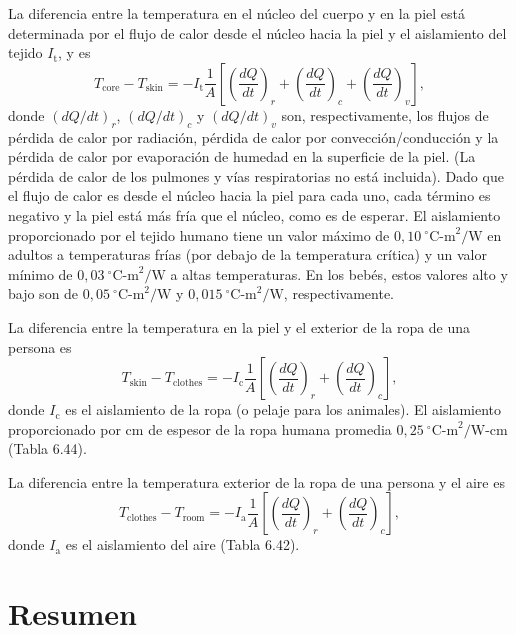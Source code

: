 \documentclass[12pt]{book}
\begin{document}
La diferencia entre la temperatura en el núcleo del cuerpo y en la piel está determinada por el flujo de calor desde el núcleo hacia la piel y el aislamiento del tejido $I_{\text{t}}$, y es
\begin{equation}
T_{\text{core}} - T_{\text{skin}} = -I_{\text{t}} \frac{1}{A} \left[ \left(\frac{dQ}{dt}\right)_r + \left(\frac{dQ}{dt}\right)_c + \left(\frac{dQ}{dt}\right)_v \right],
\label{eq:674}
\end{equation}
donde $(dQ/dt)_r$, $(dQ/dt)_c$ y $(dQ/dt)_v$ son, respectivamente, los flujos de pérdida de calor por radiación, pérdida de calor por convección/conducción y la pérdida de calor por evaporación de humedad en la superficie de la piel. (La pérdida de calor de los pulmones y vías respiratorias no está incluida). Dado que el flujo de calor es desde el núcleo hacia la piel para cada uno, cada término es negativo y la piel está más fría que el núcleo, como es de esperar. El aislamiento proporcionado por el tejido humano tiene un valor máximo de $0{,}10\ ^\circ\text{C-m}^2/\text{W}$ en adultos a temperaturas frías (por debajo de la temperatura crítica) y un valor mínimo de $0{,}03\ ^\circ\text{C-m}^2/\text{W}$ a altas temperaturas. En los bebés, estos valores alto y bajo son de $0{,}05\ ^\circ\text{C-m}^2/\text{W}$ y $0{,}015\ ^\circ\text{C-m}^2/\text{W}$, respectivamente.

La diferencia entre la temperatura en la piel y el exterior de la ropa de una persona es
\begin{equation}
T_{\text{skin}} - T_{\text{clothes}} = -I_{\text{c}} \frac{1}{A} \left[ \left(\frac{dQ}{dt}\right)_r + \left(\frac{dQ}{dt}\right)_c \right],
\label{eq:675}
\end{equation}
donde $I_{\text{c}}$ es el aislamiento de la ropa (o pelaje para los animales). El aislamiento proporcionado por cm de espesor de la ropa humana promedia $0{,}25\ ^\circ\text{C-m}^2/\text{W-cm}$ (Tabla 6.44).

La diferencia entre la temperatura exterior de la ropa de una persona y el aire es
\begin{equation}
T_{\text{clothes}} - T_{\text{room}} = -I_{\text{a}} \frac{1}{A} \left[ \left(\frac{dQ}{dt}\right)_r + \left(\frac{dQ}{dt}\right)_c \right],
\label{eq:676}
\end{equation}
donde $I_{\text{a}}$ es el aislamiento del aire (Tabla 6.42).

\section{Resumen}
\end{document}
